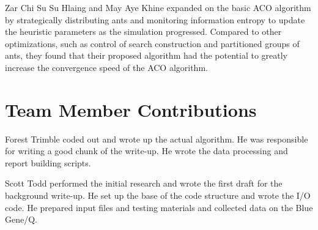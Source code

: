 \documentclass[twocolumn]{article}
\begin{document}
Zar Chi Su Su Hlaing and May Aye Khine \cite{ipcsit:aco} expanded on the basic 
ACO algorithm by strategically distributing ants and monitoring information 
entropy to update the heuristic parameters as the simulation progressed. 
Compared to other optimizations, such as control of search construction and 
partitioned groups of ants, they found that their proposed algorithm had the 
potential to greatly increase the convergence speed of the ACO algorithm. 

\section{Team Member Contributions}

\noindent Forest Trimble coded out and wrote up the actual algorithm. He was 
responsible for writing a good chunk of the write-up. He wrote the data 
processing and report building scripts. 

\noindent Scott Todd performed the initial research and wrote the first draft 
for the background write-up. He set up the base of the code structure and wrote
the I/O code. He prepared input files and testing materials and collected data 
on the Blue Gene/Q. 

\nocite{*}


\end{document}
